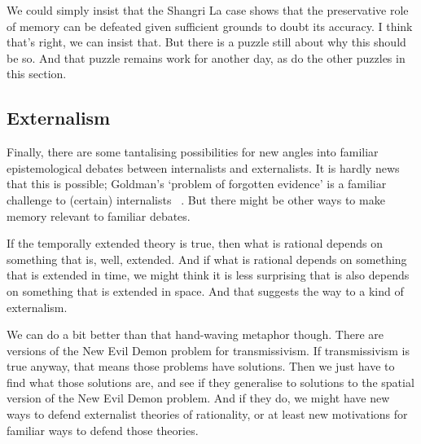 We could simply insist that the Shangri La case shows that the preservative role of memory can be defeated given sufficient grounds to doubt its accuracy. I think that's right, we can insist that. But there is a puzzle still about why this should be so. And that puzzle remains work for another day, as do the other puzzles in this section.

\subsection{Externalism}
\label{externalism}

Finally, there are some tantalising possibilities for new angles into familiar epistemological debates between internalists and externalists. It is hardly news that this is possible; Goldman's `problem of forgotten evidence' is a familiar challenge to (certain) internalists ~\citep{Goldman1999}. But there might be other ways to make memory relevant to familiar debates.

If the temporally extended theory is true, then what is rational depends on something that is, well, extended. And if what is rational depends on something that is extended in time, we might think it is less surprising that is also depends on something that is extended in space. And that suggests the way to a kind of externalism.

We can do a bit better than that hand-waving metaphor though. There are versions of the New Evil Demon problem for transmissivism. If transmissivism is true anyway, that means those problems have solutions. Then we just have to find what those solutions are, and see if they generalise to solutions to the spatial version of the New Evil Demon problem. And if they do, we might have new ways to defend externalist theories of rationality, or at least new motivations for familiar ways to defend those theories.
